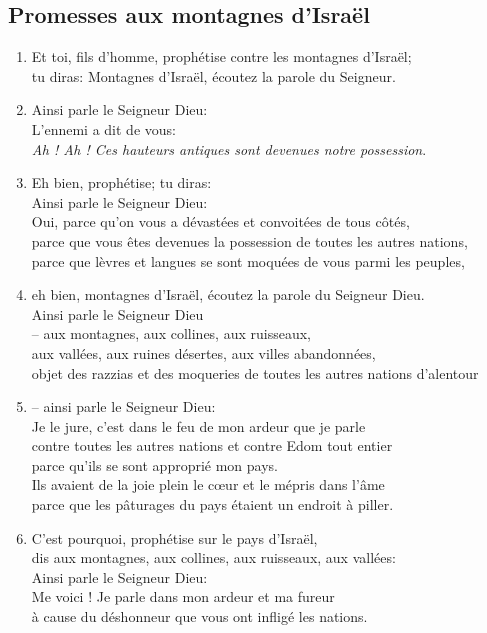 \documentclass[12pt,a4paper,titlepage]{article}
\def \pslabelsep{0.2em} %
\def \psleftmargin{0em} %
\begin{document}
\subsection*{Promesses aux montagnes d'Israël}
\begin{enumerate}[leftmargin=\psleftmargin, labelsep = \pslabelsep, label={\arabic*}, font=\color{\pscolor}\small\textsuperscript, parsep=0em, itemsep=0em, topsep=0em ]
\item Et toi, fils d’homme, prophétise contre les montagnes d’Israël; \\ tu diras: Montagnes d’Israël, écoutez la parole du Seigneur.
\item Ainsi parle le Seigneur Dieu: \\ L’ennemi a dit de vous: \\
\decalage \og{}\emph{Ah ! Ah ! Ces hauteurs antiques sont devenues notre possession}.\fg{}
\item Eh bien, prophétise; tu diras: \\ Ainsi parle le Seigneur Dieu: \\ Oui, parce qu’on vous a dévastées et convoitées de tous côtés, \\ parce que vous êtes devenues la possession de toutes les autres nations, \\ parce que lèvres et langues se sont moquées de vous parmi les peuples,
\item eh bien, montagnes d’Israël, écoutez la parole du Seigneur Dieu. \\ Ainsi parle le Seigneur Dieu \\ – aux montagnes, aux collines, aux ruisseaux, \\ aux vallées, aux ruines désertes, aux villes abandonnées, \\ objet des razzias et des moqueries de toutes les autres nations d’alentour 
\item  – ainsi parle le Seigneur Dieu: \\ Je le jure, c’est dans le feu de mon ardeur que je parle \\ contre toutes les autres nations et contre Edom tout entier \\
parce qu’ils se sont approprié mon pays. \\ Ils avaient de la joie plein le cœur et le mépris dans l’âme \\ parce que les pâturages du pays étaient un endroit à piller.
\item  C’est pourquoi, prophétise sur le pays d’Israël, \\ dis aux montagnes, aux collines, aux ruisseaux, aux vallées: \\ Ainsi parle le Seigneur Dieu: \\ Me voici ! Je parle dans mon ardeur et ma fureur \\ à cause du déshonneur que vous ont infligé les nations.

\end{enumerate}
\end{document}
